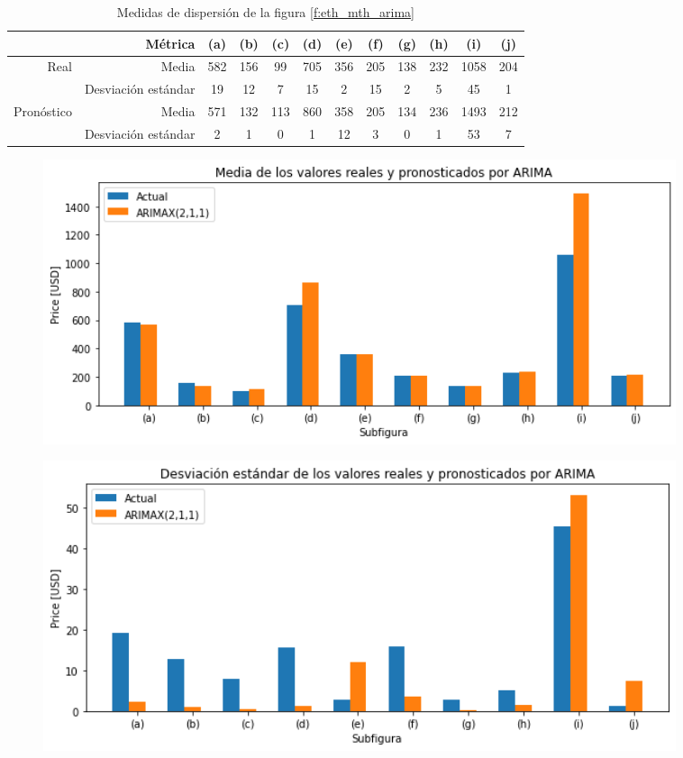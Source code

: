\documentclass[a4paper,10pt]{article}
\begin{document}
\begin{table}[H]
 \begin{center}
 \resizebox{12cm}{!} {
  \begin{tabular}{|r|r|c|c|c|c|c|c|c|c|c|c|}
    & Métrica & (a) & (b) & (c) & (d) & (e) & (f) & (g) & (h) & (i) & (j) \\ \hline
    Real & Media & 582& 156& 99& 705& 356& 205& 138& 232& 1058& 204 \\
    & Desviación estándar & 19& 12& 7& 15& 2& 15& 2& 5& 45& 1 \\
    Pronóstico & Media & 571& 132& 113& 860& 358& 205& 134& 236& 1493& 212 \\
    & Desviación estándar & 2& 1& 0& 1& 12& 3& 0& 1& 53& 7\\ \hline
  \end{tabular}
  }
  \caption{Medidas de dispersión de la figura \ref{f:eth_mth_arima}}
  \label{tab:eth_mh_avestd}
 \end{center}
\end{table}

\begin{figure}[H]
\centering
\includegraphics[width=0.9\textwidth]{./plots/arima/plots_eth_random_monthly/ave}
\label{f:eth_ave_mh}
\end{figure}


\begin{figure}[H]
\centering
\includegraphics[width=0.9\textwidth]{./plots/arima/plots_eth_random_monthly/std}
\label{f:eth_std_mth}
\end{figure}
\end{document}
